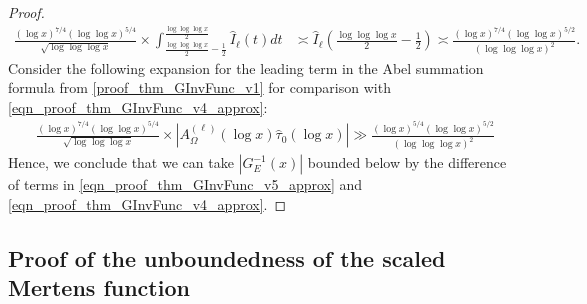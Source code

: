 \documentclass[11pt,reqno,a4letter]{article}
\numberwithin{figure}{section}
\numberwithin{table}{section}
\theoremstyle{plain}
\numberwithin{theorem}{section}
\theoremstyle{definition}
\begin{document}
\begin{proof}
\begin{align} 
\label{eqn_proof_thm_GInvFunc_v4_approx} 
\frac{(\log x)^{7/4} (\log\log x)^{5/4}}{\sqrt{\log\log\log x}} \times 
     \int_{\frac{\log\log\log x}{2}-\frac{1}{2}}^{\frac{\log\log\log x}{2}} 
     \widehat{I}_{\ell}(t) dt & \asymp 
     \widehat{I}_{\ell}\left(\frac{\log\log\log x}{2}-\frac{1}{2}\right) 
     \asymp \frac{(\log x)^{7/4} (\log\log x)^{5/2}}{(\log\log\log x)^2}. 
\end{align} 
Consider the following expansion for the leading term in 
the Abel summation formula from \eqref{proof_thm_GInvFunc_v1} for comparison with 
\eqref{eqn_proof_thm_GInvFunc_v4_approx}: 
\begin{align} 
\label{eqn_proof_thm_GInvFunc_v5_approx} 
 & \frac{(\log x)^{7/4} (\log\log x)^{5/4}}{\sqrt{\log\log\log x}} \times 
     \left\lvert A_{\Omega}^{(\ell)}(\log x) \widehat{\tau}_0(\log x) \right\rvert 
     \gg 
     \frac{(\log x)^{5/4} (\log\log x)^{5/2}}{(\log\log\log x)^2}
\end{align} 
Hence, we conclude that we can take $\left\lvert G_{E}^{-1}\left(x\right) \right\rvert$ 
bounded below by the difference of terms in 
\eqref{eqn_proof_thm_GInvFunc_v5_approx} and 
\eqref{eqn_proof_thm_GInvFunc_v4_approx}. 
\end{proof} 

\subsection{Proof of the unboundedness of the scaled Mertens function}
\label{subSection_TheCoreResultProof} 
\end{document}
